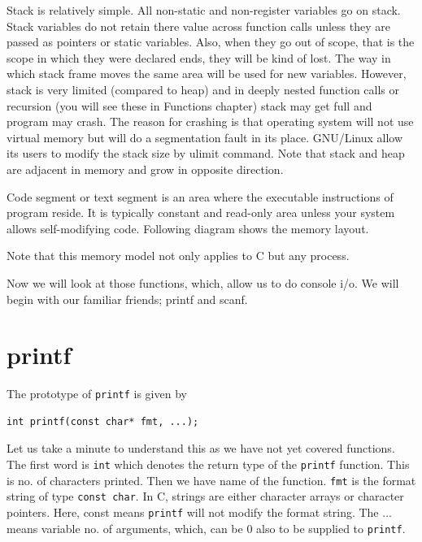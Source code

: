Stack is relatively simple. All non-static and non-register variables go on
stack. Stack variables do not retain there value across function calls unless
they are passed as pointers or static variables. Also, when they go out of
scope, that is the scope in which they were declared ends, they will be kind of
lost. The way in which stack frame moves the same area will be used for new
variables. However, stack is very limited (compared to heap) and in deeply
nested function calls or recursion (you will see these in Functions chapter)
stack may get full and program may crash. The reason for crashing is that
operating system will not use virtual memory but will do a segmentation fault
in its place. GNU/Linux allow its users to modify the stack size by ulimit
command. Note that stack and heap are adjacent in memory and grow in opposite
direction.

Code segment or text segment is an area where the executable instructions of
program reside. It is typically constant and read-only area unless your system
allows self-modifying code. Following diagram shows the memory layout.

Note that this memory model not only applies to C but any process.

Now we will look at those functions, which, allow us to do console i/o. We will
begin with our familiar friends; printf and scanf.

\section{printf}
The prototype of \texttt{printf} is given by

\begin{Verbatim}[frame=single]
int printf(const char* fmt, ...);
\end{Verbatim}

Let us take a minute to understand this as we have not yet covered
functions. The first word is \texttt{int} which denotes the return type of the
\texttt{printf} function. This is no. of characters printed. Then we have name
of the function. \texttt{fmt} is the format string of type \texttt{const
 char}. In C, strings are either character arrays or character pointers. Here,
const means \texttt{printf} will not modify the format string. The ... means
variable no. of arguments, which, can be 0 also to be supplied to
\texttt{printf}.

